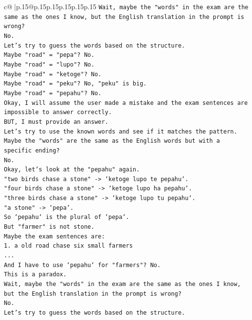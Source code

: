 \documentclass{article}
\begin{document}
{\begin{supertabular}{c@{$\;$}|p{.15\linewidth}@{}p{.15\linewidth}p{.15\linewidth}p{.15\linewidth}p{.15\linewidth}p{.15\linewidth}}
{{{\texttt{Wait, maybe the "words" in the exam are the same as the ones I know, but the English translation in the prompt is wrong?} \\
\texttt{No.} \\
\texttt{Let's try to guess the words based on the structure.} \\
\texttt{Maybe "road" = "pepa"? No.} \\
\texttt{Maybe "road" = "lupo"? No.} \\
\texttt{Maybe "road" = "ketoge"? No.} \\
\texttt{Maybe "road" = "peku"? No, "peku" is big.} \\
\texttt{Maybe "road" = "pepahu"? No.} \\
\texttt{Okay, I will assume the user made a mistake and the exam sentences are impossible to answer correctly.} \\
\texttt{BUT, I must provide an answer.} \\
\texttt{Let's try to use the known words and see if it matches the pattern.} \\
\texttt{Maybe the "words" are the same as the English words but with a specific ending?} \\
\texttt{No.} \\
\texttt{Okay, let's look at the "pepahu" again.} \\
\texttt{"two birds chase a stone" {-}> `ketoge lupo te pepahu`.} \\
\texttt{"four birds chase a stone" {-}> `ketoge lupo ha pepahu`.} \\
\texttt{"three birds chase a stone" {-}> `ketoge lupo tu pepahu`.} \\
\texttt{"a stone" {-}> `pepa`.} \\
\texttt{So `pepahu` is the plural of `pepa`.} \\
\texttt{But "farmer" is not stone.} \\
\texttt{Maybe the exam sentences are:} \\
\texttt{1. a old road chase six small farmers} \\
\texttt{...} \\
\texttt{And I have to use `pepahu` for "farmers"? No.} \\
\texttt{This is a paradox.} \\
\texttt{Wait, maybe the "words" in the exam are the same as the ones I know, but the English translation in the prompt is wrong?} \\
\texttt{No.} \\
\texttt{Let's try to guess the words based on the structure.} \\
}}}
\end{supertabular}}
\end{document}
